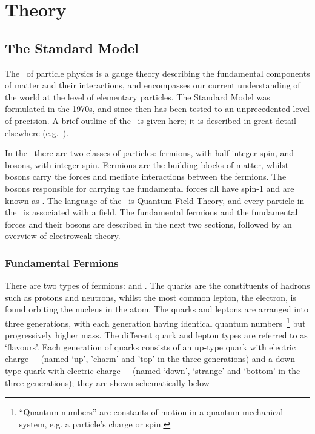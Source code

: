 \graphicspath{{Chapters/Theory/Figures/}}
\chapter{Theory}
\label{chap:Theory}

\section{The Standard Model}

The \sm\ of particle physics is a gauge theory describing the
fundamental components of matter and their interactions, and encompasses our
current understanding of the world at the level of elementary particles. The Standard Model was
formulated in the 1970s, and since then has been tested to an unprecedented
level of precision. %
A brief outline of the \sm\ is given here; it is described in great detail
elsewhere (e.g.~\cite{ALTARELLI:2005zv,cottingham2007introduction,ralnotes}).

In the \sm\ there are two classes of particles: fermions, with half-integer
spin, and bosons, with integer spin. Fermions are the building blocks of matter,
whilst bosons carry the forces and mediate interactions between the
fermions. The bosons responsible for carrying the fundamental forces all have
spin-1 and are known as .
The language of the \sm\ is Quantum Field Theory, and every particle in the \sm\
is associated with a field. The fundamental fermions and the fundamental forces
and their bosons are described in the next two sections, followed by an overview
of electroweak theory.

\subsection{Fundamental Fermions}

There are two types of fermions:  and . The quarks are the
constituents of hadrons such as protons and neutrons, whilst the most common
lepton, the electron, is found orbiting the nucleus in the atom. 
The quarks and leptons are arranged into three generations, with each
generation having identical quantum numbers~\footnote{``Quantum numbers'' are
constants of motion in a quantum-mechanical system, e.g. a particle's charge or
spin.} but progressively higher mass. The
different quark and lepton types are referred to as `flavours'. Each
generation of quarks consists of an up-type quark with electric charge
$+$\nicefrac{2}{3}
(named `up', 'charm' and 'top' in the three generations) and a down-type quark
with electric charge $-$\nicefrac{1}{3} (named `down', `strange' and `bottom' in the three
generations); they are shown schematically below

